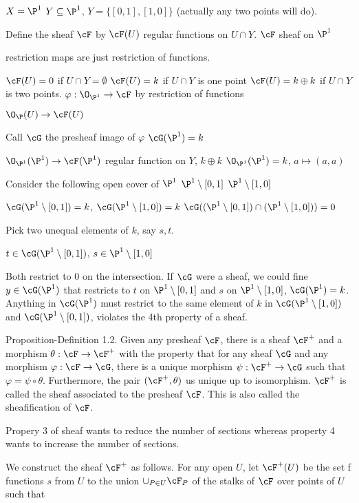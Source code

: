 $X= \P^1$
$Y \subseteq \P^1$, $Y= \{ [0,1], [1,0] \}$
(actually any two points will do).

Define the sheaf $\cF$ by 
$\cF(U)$ regular functions on $U \cap Y$.
$\cF$ sheaf on $\P^1$

restriction maps are just restriction of functions. 

$\cF(U)= 0$ if $U \cap Y= \emptyset$
$\cF(U)= k$ if $U \cap Y$ is one point
$\cF(U)= k \oplus k$ if $U \cap Y$ is two points.
$\varphi: \O_{\P^1} \to \cF$ by restriction
of functions

$\O_{\P}(U) \to \cF(U)$

Call $\cG$ the presheaf image of $\varphi$
$\cG(\P^1)= k$

$\O_{\P^1}(\P^1) \to \cF(\P^1)$ regular function on $Y$, $k \oplus k$
$\O_{\P^1}(\P^1) = k$,
$a \mapsto (a,a)$

Consider the following open cover of $\P^1$
$\P^1 \setminus [0,1]$
$\P^1 \setminus [1,0]$

$\cG(\P^1 \setminus [0,1])=k$, $\cG(\P^1 \setminus [1,0])= k$
$\cG( (\P^1 \setminus [0,1]) \cap (\P^1 \setminus [1,0]))= 0$

Pick two unequal elements of $k$, say $s,t$. 

$t \in \cG(\P^1 \setminus [0,1])$, $s \in \P^1 \setminus [1,0]$

Both restrict to $0$ on the intersection. If $\cG$ were a sheaf, we could fine $y \in \cG(\P^1)$ that restricts to $t$ on $\P^1 \setminus [0,1]$ and $s$ on $\P^1 \setminus [1,0]$, $\cG(\P^1)= k$. Anything in $\cG(\P^1)$ must restrict to the same element of $k$ in $\cG(\P^1 \setminus [1,0])$ and $\cG(\P^1 \setminus [0,1])$, violates the 4th property of a sheaf. 






Proposition-Definition 1.2. 
Given any presheaf $\cF$, there is a sheaf $\cF^+$ and a morphism $\theta: \cF \to \cF^+$ with the property that for any sheaf $\cG$ and any morphism $\varphi: \cF \to \cG$, there is a unique morphism $\psi: \cF^+ \to \cG$ such that $\varphi= \psi \circ \theta$. Furthermore, the pair $(\cF^+, \theta)$ us unique up to isomorphism. $\cF^+$ is called the sheaf associated to the presheaf $\cF$. This is also called the sheafification of $\cF$. 


Propery 3 of sheaf wants to reduce the number of sections whereas property 4 wants to increase the number of sections. 


\pf We construct the sheaf $\cF^+$ as follows. For any open $U$, let $\cF^+(U)$ be the set f functions $s$ from $U$ to the union $\cup_{P \in U} \cF_P$ of the stalks of $\cF$ over points of $U$ such that 

